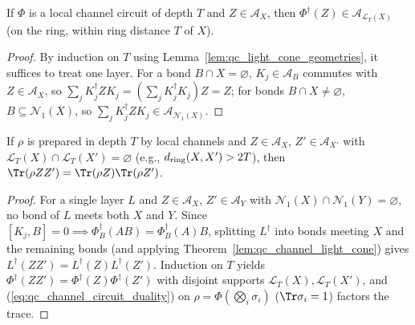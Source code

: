 \begin{theorem}
    \label{lem:qc_channel_light_cone}
    \leanok
    If $\Phi$ is a local channel circuit of depth $T$ and $Z\in\mathcal A_X$, then $\Phi^\dagger(Z)\in\mathcal A_{\mathcal L_T(X)}$ (on the ring, within ring distance $T$ of $X$).
\end{theorem}
\begin{proof}
    \leanok
    By induction on $T$ using Lemma~\ref{lem:qc_light_cone_geometries}, it suffices to treat one layer. For a bond $B\cap X=\varnothing$, $K_j\in\mathcal A_B$ commutes with $Z\in\mathcal A_X$, so $\sum_j K_j^\dagger ZK_j=(\sum_j K_j^\dagger K_j)Z=Z$; for bonds $B\cap X\ne\varnothing$, $B\subseteq\mathcal N_1(X)$, so $\sum_j K_j^\dagger ZK_j\in\mathcal A_{\mathcal N_1(X)}$.
\end{proof}

\begin{lemma}
    \label{lem:qc_channel_light_cone_correlations}
    \leanok
    If $\rho$ is prepared in depth $T$ by local channels and $Z\in\mathcal A_X$, $Z'\in\mathcal A_{X'}$ with $\mathcal L_T(X)\cap\mathcal L_T(X')=\varnothing$ (e.g., $d_{\rm ring}(X,X')>2T$), then $\Tr(\rho ZZ')=\Tr(\rho Z)\Tr(\rho Z')$.
\end{lemma}
\begin{proof}
    \leanok
    For a single layer $L$ and $Z\in\mathcal A_X$, $Z'\in\mathcal A_Y$ with $\mathcal N_1(X)\cap\mathcal N_1(Y)=\varnothing$, no bond of $L$ meets both $X$ and $Y$. Since $[K_j,B]=0\implies\Phi_B^\dagger(AB)=\Phi_B^\dagger(A)B$, splitting $L^\dagger$ into bonds meeting $X$ and the remaining bonds (and applying Theorem~\ref{lem:qc_channel_light_cone}) gives $L^\dagger(ZZ')=L^\dagger(Z)L^\dagger(Z')$. Induction on $T$ yields $\Phi^\dagger(ZZ')=\Phi^\dagger(Z)\Phi^\dagger(Z')$ with disjoint supports $\mathcal L_T(X),\mathcal L_T(X')$, and (\ref{eq:qc_channel_circuit_duality}) on $\rho=\Phi(\bigotimes_i\sigma_i)$ ($\Tr\sigma_i=1$) factors the trace.
\end{proof}

